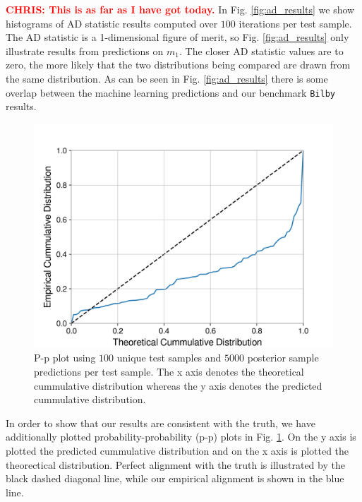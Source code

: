 \documentclass[%
showpacs,
 amsmath,amssymb,
 aps,
 twocolumn,
 prl,
 reprint,
floatfix,
]{revtex4-1}
\newcommand{\chris}[1]{\textbf{\textcolor{red}{CHRIS: #1}}}
\begin{document}
\chris{This is as far as I have got today.} In Fig. \ref{fig:ad_results} we
show histograms of AD statistic results computed over $100$ iterations per test
sample.  The AD statistic is a 1-dimensional figure of merit, so Fig.
\ref{fig:ad_results} only illustrate results from predictions on $m_1$. The
closer AD statistic values are to zero, the more likely that the two
distributions being compared are drawn from the same distribution. As can be
seen in Fig. \ref{fig:ad_results} there is some overlap between the machine
learning predictions and our benchmark \texttt{Bilby} results.

%
%
\begin{figure}
    \includegraphics[width=\columnwidth]{images/latest_pp_plot.png}
    \caption{\label{fig:pp_plot} P-p plot 
    using $100$ unique test samples and $5000$
    posterior sample predictions per test sample. 
    The x axis denotes the theoretical cummulative 
    distribution whereas the y axis denotes 
    the predicted cummulative distribution.}
\end{figure}

In order to show that our results are consistent with the 
truth, we have additionally plotted probability-probability (p-p) 
plots in Fig. \ref{fig:pp_plot}. On the y axis is plotted the predicted 
cummulative distribution and on the x axis is plotted the theorectical 
distribution. Perfect alignment with the truth is illustrated by the 
black dashed diagonal line, while our empirical alignment is 
shown in the blue line. 
\end{document}
